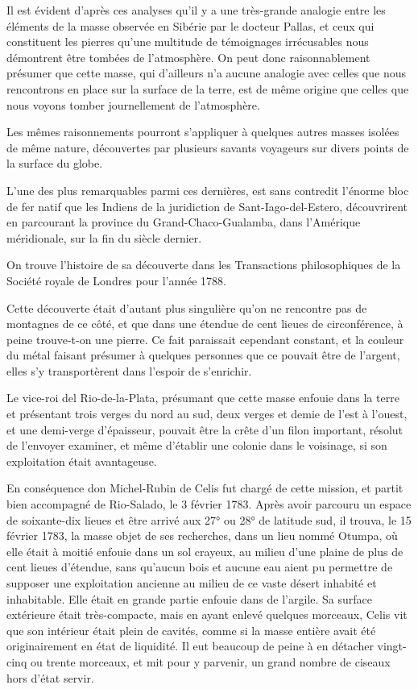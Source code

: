 \documentclass[a4paper, 12pt, oneside, french]{article}
\begin{document}
Il est évident d'après ces analyses qu'il y a une très-grande analogie entre les éléments de la masse observée en Sibérie par le docteur Pallas, et ceux qui constituent les pierres qu'une multitude de témoignages irrécusables nous démontrent être tombées de l'atmosphère. On peut donc raisonnablement présumer que cette masse, qui d'ailleurs n'a aucune analogie avec celles que nous rencontrons en place sur la surface de la terre, est de même origine que celles que nous voyons tomber journellement de l'atmosphère.

Les mêmes raisonnements pourront s'appliquer à quelques autres masses isolées de même nature, découvertes par plusieurs savants voyageurs sur divers points de la surface du globe.

L'une des plus remarquables parmi ces dernières, est sans contredit l'énorme bloc de fer natif que les Indiens de la juridiction de Sant-Iago-del-Estero, découvrirent en parcourant la province du Grand-Chaco-Gualamba, dans l'Amérique méridionale, sur la fin du siècle dernier.

On trouve l'histoire de sa découverte dans les Transactions philosophiques de la Société royale de Londres pour l'année 1788.

Cette découverte était d'autant plus singulière qu'on ne rencontre pas de montagnes de ce côté, et que dans une étendue de cent lieues de circonférence, à peine trouve-t-on une pierre. Ce fait paraissait cependant constant, et la couleur du métal faisant présumer à quelques personnes que ce pouvait être de l'argent, elles s'y transportèrent dans l'espoir de s'enrichir.

Le vice-roi del Rio-de-la-Plata, présumant que cette masse enfouie dans la terre et présentant trois verges du nord au sud, deux verges et demie de l'est à l'ouest, et une demi-verge d'épaisseur, pouvait être la crête d'un filon important, résolut de l'envoyer examiner, et même d'établir une colonie dans le voisinage, si son exploitation était avantageuse.

En conséquence don Michel-Rubin de Celis fut chargé de cette mission, et partit bien accompagné de Rio-Salado, le 3 février 1783. Après avoir parcouru un espace de soixante-dix lieues et être arrivé aux 27° ou 28° de latitude sud, il trouva, le 15 février 1783, la masse objet de ses recherches, dans un lieu nommé Otumpa, où elle était à moitié enfouie dans un sol crayeux, au milieu d'une plaine de plus de cent lieues d'étendue, sans qu'aucun bois et aucune eau aient pu permettre de supposer une exploitation ancienne au milieu de ce vaste désert inhabité et inhabitable. Elle était en grande partie enfouie dans de l'argile. Sa surface extérieure était très-compacte, mais en ayant enlevé quelques morceaux, Celis vit que son intérieur était plein de cavités, comme si la masse entière avait été originairement en état de liquidité. Il eut beaucoup de peine à en détacher vingt-cinq ou trente morceaux, et mit pour y parvenir, un grand nombre de ciseaux hors d'état servir.
\end{document}
